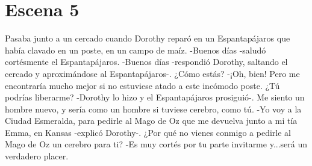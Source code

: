 \chapter{Escena 5}
Pasaba junto a un cercado cuando Dorothy reparó en un Espantapájaros que había clavado en un poste, en un campo de maíz.
-Buenos días -saludó cortésmente el Espantapájaros.
-Buenos días -respondió Dorothy, saltando el cercado y aproximándose al Espantapájaros-. ¿Cómo estás?
-¡Oh, bien! Pero me encontraría mucho mejor si no estuviese atado a este incómodo poste. ¿Tú podrías liberarme? -Dorothy lo hizo y el Espantapájaros prosiguió-. Me siento un hombre nuevo, y sería como un hombre si tuviese cerebro, como tú.
-Yo voy a la Ciudad Esmeralda, para pedirle al Mago de Oz que me devuelva junto a mi tía Emma, en Kansas -explicó Dorothy-. ¿Por qué no vienes conmigo a pedirle al Mago de Oz un cerebro para ti?
-Es muy cortés por tu parte invitarme y...será un verdadero placer.